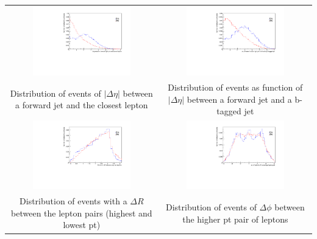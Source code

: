 \documentclass[11pt]{beamer}
\newcommand\Fontvi{\fontsize{4}{7.2}\selectfont}
\begin{document}
{\nologo
	\begin{frame}
		\Fontvi
		\begin{center}
			\begin{tabular}{cc}
				\includegraphics[width=5.5cm,height=3cm]{figures/distributions/compare_variables-eta-fj-cl} &
				\includegraphics[width=5.5cm,height=3cm]{figures/distributions/compare_variables-eta-fj-b1}\\ 
				{Distribution of events of $|\Delta\eta|$ between a forward jet and the closest lepton} & {	Distribution of events as function of $|\Delta\eta|$ between a forward jet and a b-tagged jet } \\
				\includegraphics[width=5.5cm,height=3cm]{figures/distributions/compare_variables-dr}&
				\includegraphics[width=5.5cm,height=3cm]{figures/distributions/compare_variables-phi}\\
				{Distribution of events with a $\Delta R$ between the lepton pairs (highest and lowest pt)} & {Distribution of events of $\Delta\phi$ between the higher pt pair of leptons } \\
			\end{tabular}
		\end{center}
	\end{frame}
}
\end{document}
